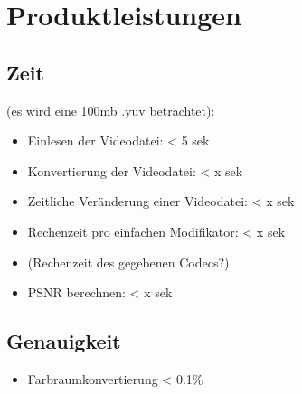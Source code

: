 \section{Produktleistungen}

\subsection{Zeit} (es wird eine 100mb .yuv betrachtet):
\begin{itemize}
	\item Einlesen der Videodatei: < 5 sek
	\item Konvertierung der Videodatei: < x sek
	\item Zeitliche Veränderung einer Videodatei: < x sek 
	\item Rechenzeit pro einfachen Modifikator: < x sek
	\item (Rechenzeit des gegebenen Codecs?) 
	\item PSNR berechnen: < x sek
\end{itemize}

\subsection{Genauigkeit}
\begin{itemize}
	\item Farbraumkonvertierung < 0.1\%
\end{itemize}
